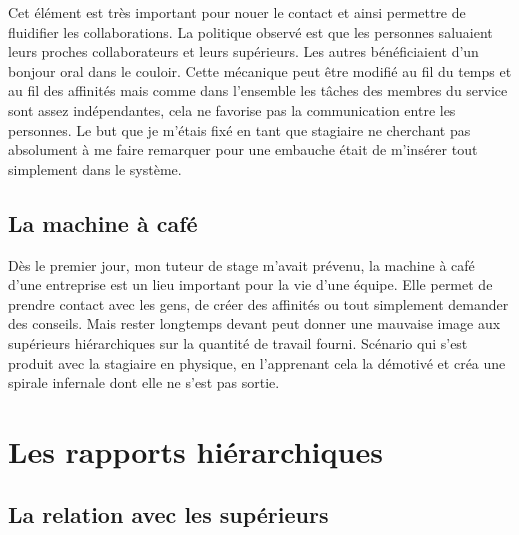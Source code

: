 \documentclass[a4paper,11pt]{article}
\begin{document}
\normalsize{
Cet élément est très important pour nouer le contact et ainsi permettre de fluidifier les collaborations. La politique observé est que les personnes saluaient leurs proches collaborateurs et leurs supérieurs. Les autres bénéficiaient d'un bonjour oral dans le couloir. Cette mécanique peut être modifié au fil du temps et au fil des affinités mais comme dans l'ensemble les tâches des membres du service sont assez indépendantes, cela ne favorise pas la communication entre les personnes. Le but que je m'étais fixé en tant que stagiaire ne cherchant pas absolument à me faire remarquer pour une embauche était de m'insérer tout simplement dans le système.
}

\subsection{La machine à café}
\normalsize{
Dès le premier jour, mon tuteur de stage m'avait prévenu, la machine à café d'une entreprise est un lieu important pour la vie d'une équipe. Elle permet de prendre contact avec les gens, de créer des affinités ou tout simplement demander des conseils. Mais rester longtemps devant peut donner une mauvaise image aux supérieurs hiérarchiques sur la quantité de travail fourni. Scénario qui s'est produit avec la stagiaire en physique, en l'apprenant cela la démotivé et créa une spirale infernale dont elle ne s'est pas sortie.
}

\section{Les rapports hiérarchiques}

\subsection{La relation avec les supérieurs}
\end{document}
